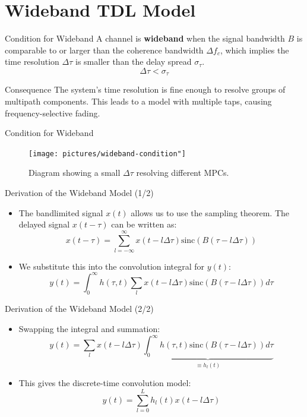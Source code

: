 \documentclass{beamer}
\begin{document}
	\section{Wideband TDL Model}
	
	\begin{frame}{Condition for Wideband}
		A channel is \textbf{wideband} when the signal bandwidth $B$ is comparable to or larger than the coherence bandwidth $\Delta f_c$, which implies the time resolution $\Delta\tau$ is smaller than the delay spread $\sigma_\tau$.
		\[ \Delta\tau < \sigma_\tau \]
		
		\begin{block}{Consequence}
			The system's time resolution is fine enough to resolve groups of multipath components. This leads to a model with multiple taps, causing frequency-selective fading.
		\end{block}
	\end{frame}
	
	\begin{frame}{Condition for Wideband}
		\begin{figure}
			\centering
			\texttt{[image: pictures/wideband-condition"]}
			\caption{Diagram showing a small $\Delta\tau$ resolving different MPCs.}
		\end{figure}	
	\end{frame}
	
	\begin{frame}{Derivation of the Wideband Model (1/2)}
		\begin{itemize}
			\item The bandlimited signal $x(t)$ allows us to use the sampling theorem. The delayed signal $x(t-\tau)$ can be written as:
			\[ x(t-\tau) = \sum_{l=-\infty}^{\infty} x(t-l\Delta\tau) \text{sinc}(B(\tau - l\Delta\tau)) \]
			
			\item We substitute this into the convolution integral for $y(t)$:
			\[ y(t) = \int_0^{\infty} h(\tau, t) \sum_{l} x(t-l\Delta\tau) \text{sinc}(B(\tau-l\Delta\tau)) d\tau \]
		\end{itemize}
	\end{frame}
	
	\begin{frame}{Derivation of the Wideband Model (2/2)}
		\begin{itemize}
			\item Swapping the integral and summation:
			\[ y(t) = \sum_{l} x(t-l\Delta\tau) \underbrace{\int_0^{\infty} h(\tau, t) \text{sinc}(B(\tau-l\Delta\tau)) d\tau}_{\equiv h_l(t)} \]
			
			\item This gives the discrete-time convolution model:
			\[ y(t) = \sum_{l=0}^{L} h_l(t) x(t-l\Delta\tau) \]
		\end{itemize}
	\end{frame}
	
\end{document}
